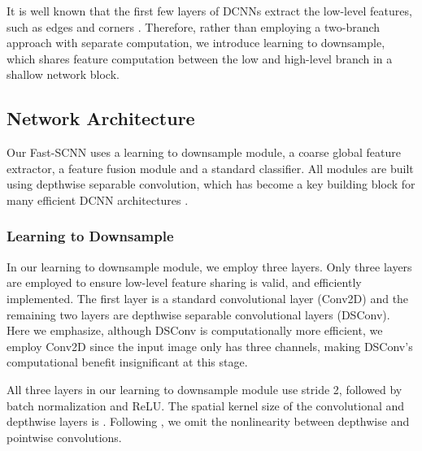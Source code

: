 \documentclass[10pt,twocolumn,letterpaper]{article}
\begin{document}
It is well known that the first few layers of DCNNs extract the low-level features, such as edges and corners \cite{deconv-zeiler2014,olah2017}. Therefore, rather than employing a two-branch approach with separate computation, we introduce learning to downsample, which shares feature computation between the low and high-level branch in a shallow network block.

\subsection{Network Architecture}
Our Fast-SCNN uses a learning to downsample module, a coarse global feature extractor, a feature fusion module and a standard classifier. All modules are built using depthwise separable convolution, which has become a key building block for many efficient DCNN architectures \cite{xception-net-chollet2016,mobilenet-howard2017,contextnet-poudel2018}.

\subsubsection{Learning to Downsample}
In our learning to downsample module, we employ three layers. Only three layers are employed to ensure low-level feature sharing is valid, and efficiently implemented. The first layer is a standard convolutional layer (Conv2D) and the remaining two layers are depthwise separable convolutional layers (DSConv). Here we emphasize, although DSConv is computationally more efficient, we employ Conv2D since the input image only has three channels, making DSConv's computational benefit insignificant at this stage.

All three layers in our learning to downsample module use stride 2, followed by batch normalization \cite{batch-norm-ioffe2015} and ReLU. The spatial kernel size of the convolutional and depthwise layers is . Following \cite{xception-net-chollet2016,inverted-res-bottlenecks-sandler2018,contextnet-poudel2018}, we omit the nonlinearity between depthwise and pointwise convolutions.
\end{document}
